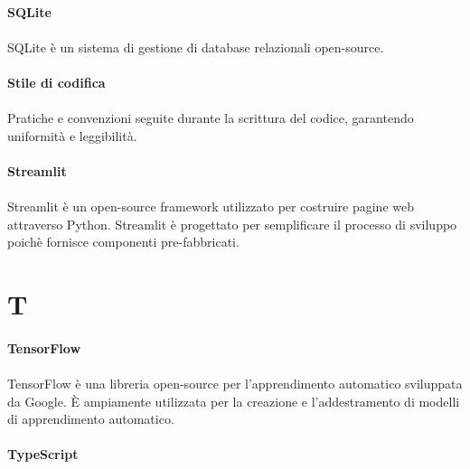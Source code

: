 \documentclass[10pt, a4paper]{article}
\begin{document}
\paragraph{SQLite}\noindent\hrulefill
\paragraph{}SQLite è un sistema di gestione di database relazionali open-source.

\vspace{2em}
\paragraph{Stile di codifica}\noindent\hrulefill
\paragraph{}Pratiche e convenzioni seguite durante la scrittura del codice, garantendo uniformità e leggibilità.


\paragraph{Streamlit}\noindent\hrulefill
\paragraph{}Streamlit è un open-source framework utilizzato per costruire pagine web attraverso Python. Streamlit è progettato per semplificare il processo di sviluppo poichè fornisce componenti pre-fabbricati.

\newpage
\section{T}
\vspace{2em}
\paragraph{TensorFlow}\noindent\hrulefill
\paragraph{}TensorFlow è una libreria open-source per l'apprendimento automatico sviluppata da Google. È ampiamente utilizzata per la creazione e l'addestramento di modelli di apprendimento automatico.

\vspace{2em}
\paragraph{TypeScript}\noindent\hrulefill
\end{document}
